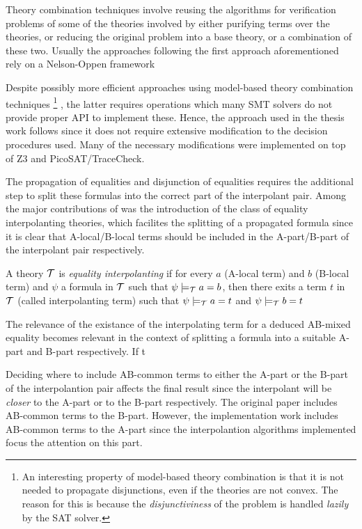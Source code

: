 Theory combination techniques involve 
reusing the algorithms for verification 
problems of some of the theories involved 
by either purifying terms over the 
theories, or reducing the original problem 
into a base theory, or a combination of these two. 
Usually the approaches following the first approach 
aforementioned rely on a Nelson-Oppen
framework \cite{10.1007/11532231_26, 
10.1007/978-3-642-22119-4_1, 10.1145/2490253}

Despite possibly more efficient approaches using
model-based theory combination techniques 
\footnote{
  An interesting property of model-based theory combination 
  is that it is not needed to propagate disjunctions, even if
  the theories are not convex. The reason for this is because
  the \emph{disjunctiviness} of the problem is handled 
  \emph{lazily} by the
  SAT solver.
} \cite{10.1007/978-3-642-22119-4_1}, the latter requires 
operations which many SMT solvers do not provide 
proper API to implement these.
Hence, the approach used in the thesis work follows 
\cite{10.1007/11532231_26} since it does not require extensive
modification to the decision procedures
used. Many of the necessary modifications 
were implemented on top of Z3 and PicoSAT/TraceCheck.

The propagation of equalities and disjunction of equalities
requires the additional step to split these formulas into
the correct part of the interpolant pair. Among the major
contributions of \cite{10.1007/11532231_26} was the introduction
of the class of equality interpolanting theories, which
facilites the splitting of a propagated formula since
it is clear that A-local/B-local terms should be included in the
A-part/B-part of the interpolant pair respectively.

\begin{definition}
  A theory $\cal{T}$ is \emph{equality interpolanting}
  if for every $a$ (A-local term) and  $b$ (B-local term)
  and $\psi$ a formula in $\cal{T}$ such that
  $\psi \models_{\cal{T}} a = b$, then there exits a term $t$
  in $\cal{T}$ (called interpolanting term)
  such that $\psi \models_{\cal{T}} a = t$ and 
  $\psi \models_{\cal{T}} b = t$
\end{definition}

The relevance of the existance of the interpolating term for 
a deduced AB-mixed equality becomes relevant in the context 
of splitting a formula into a suitable A-part and B-part 
respectively. If t

Deciding where to include AB-common terms to either the 
A-part or the B-part of the interpolantion pair affects 
the final result since the interpolant will be \emph{closer} 
to the A-part or to the B-part respectively. The original
paper includes AB-common terms to the B-part. However,
the implementation work includes AB-common terms to the
A-part since the interpolantion algorithms implemented
focus the attention on this part.

